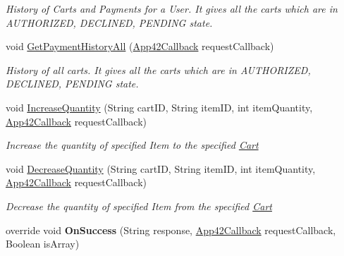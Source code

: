 \begin{DoxyCompactItemize}
\begin{DoxyCompactList}\small\item\em History of Carts and Payments for a User. It gives all the carts which are in A\+U\+T\+H\+O\+R\+I\+Z\+E\+D, D\+E\+C\+L\+I\+N\+E\+D, P\+E\+N\+D\+I\+N\+G state. \end{DoxyCompactList}\item 
void \hyperlink{classcom_1_1shephertz_1_1app42_1_1paas_1_1sdk_1_1windows_1_1shopping_1_1_cart_service_a1a46f634401b69f2f673cd4a64ea6338}{Get\+Payment\+History\+All} (\hyperlink{interfacecom_1_1shephertz_1_1app42_1_1paas_1_1sdk_1_1windows_1_1_app42_callback}{App42\+Callback} request\+Callback)
\begin{DoxyCompactList}\small\item\em History of all carts. It gives all the carts which are in A\+U\+T\+H\+O\+R\+I\+Z\+E\+D, D\+E\+C\+L\+I\+N\+E\+D, P\+E\+N\+D\+I\+N\+G state. \end{DoxyCompactList}\item 
void \hyperlink{classcom_1_1shephertz_1_1app42_1_1paas_1_1sdk_1_1windows_1_1shopping_1_1_cart_service_aee2c32a355347696874052f723bee24b}{Increase\+Quantity} (String cart\+I\+D, String item\+I\+D, int item\+Quantity, \hyperlink{interfacecom_1_1shephertz_1_1app42_1_1paas_1_1sdk_1_1windows_1_1_app42_callback}{App42\+Callback} request\+Callback)
\begin{DoxyCompactList}\small\item\em Increase the quantity of specified Item to the specified \hyperlink{classcom_1_1shephertz_1_1app42_1_1paas_1_1sdk_1_1windows_1_1shopping_1_1_cart}{Cart} \end{DoxyCompactList}\item 
void \hyperlink{classcom_1_1shephertz_1_1app42_1_1paas_1_1sdk_1_1windows_1_1shopping_1_1_cart_service_ad73c94e6340f10297fda169de6f13771}{Decrease\+Quantity} (String cart\+I\+D, String item\+I\+D, int item\+Quantity, \hyperlink{interfacecom_1_1shephertz_1_1app42_1_1paas_1_1sdk_1_1windows_1_1_app42_callback}{App42\+Callback} request\+Callback)
\begin{DoxyCompactList}\small\item\em Decrease the quantity of specified Item from the specified \hyperlink{classcom_1_1shephertz_1_1app42_1_1paas_1_1sdk_1_1windows_1_1shopping_1_1_cart}{Cart} \end{DoxyCompactList}\item 
\hypertarget{classcom_1_1shephertz_1_1app42_1_1paas_1_1sdk_1_1windows_1_1shopping_1_1_cart_service_ad4c986385deadc698ca827e123eab099}{override void {\bfseries On\+Success} (String response, \hyperlink{interfacecom_1_1shephertz_1_1app42_1_1paas_1_1sdk_1_1windows_1_1_app42_callback}{App42\+Callback} request\+Callback, Boolean is\+Array)}\label{classcom_1_1shephertz_1_1app42_1_1paas_1_1sdk_1_1windows_1_1shopping_1_1_cart_service_ad4c986385deadc698ca827e123eab099}


\end{DoxyCompactItemize}
